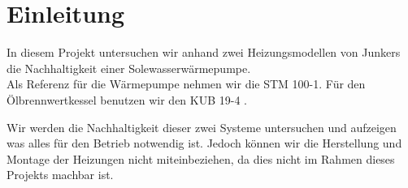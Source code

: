 \chapter{Einleitung}
\label{chap:einleitung}

In diesem Projekt untersuchen wir anhand zwei Heizungsmodellen von Junkers\cite{junkers:home} die Nachhaltigkeit einer Solewasserwärmepumpe. \\
Als Referenz für die Wärmepumpe nehmen wir die STM 100-1\cite{junkers:stm-100-1}. Für den Ölbrennwertkessel benutzen wir den KUB 19-4 \cite{junkers:kub-19-4}.

Wir werden die Nachhaltigkeit dieser zwei Systeme untersuchen und aufzeigen was alles für den Betrieb notwendig ist. Jedoch können wir die Herstellung und Montage der Heizungen nicht miteinbeziehen, da dies nicht im Rahmen dieses Projekts machbar ist.



